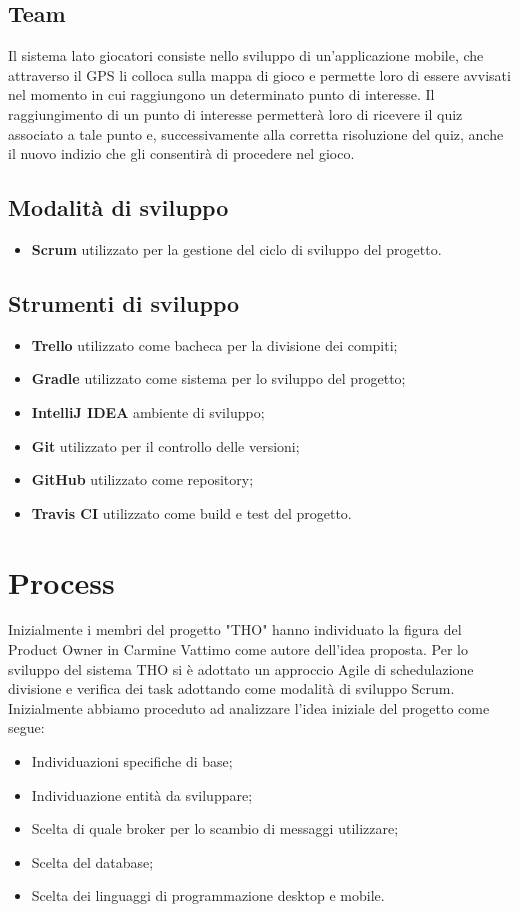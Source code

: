 \documentclass[10pt, english]{article}
\begin{document}
\subsection*{Team}
Il sistema lato giocatori consiste nello sviluppo di un'applicazione mobile, che attraverso il GPS li colloca sulla mappa di gioco e permette loro di essere avvisati nel momento in cui raggiungono un determinato punto di interesse. Il raggiungimento di un punto di interesse permetterà loro di ricevere il quiz associato a tale punto e, successivamente alla corretta risoluzione del quiz, anche il nuovo indizio che gli consentirà di procedere nel gioco.

\subsection*{Modalità di sviluppo}
\begin{itemize}
	\item \textbf{Scrum} utilizzato per la gestione del ciclo di sviluppo del progetto.
\end{itemize}
\subsection*{Strumenti di sviluppo}
\begin{itemize}
	\item \textbf{Trello} utilizzato come bacheca per la divisione dei compiti;
	\item \textbf{Gradle} utilizzato come sistema per lo sviluppo del progetto;
	\item \textbf{IntelliJ IDEA} ambiente di sviluppo;
	\item \textbf{Git} utilizzato per il controllo delle versioni;
	\item \textbf{GitHub} utilizzato come repository;
	\item \textbf{Travis CI} utilizzato come build e test del progetto.
\end{itemize}

\section{Process}
Inizialmente i membri del progetto "THO" hanno individuato la figura del Product Owner in Carmine Vattimo come autore dell'idea proposta. Per lo sviluppo del sistema THO si è adottato un approccio Agile di schedulazione divisione e verifica dei task adottando come modalità di sviluppo Scrum. 
\\ Inizialmente abbiamo proceduto ad analizzare l'idea iniziale del progetto come segue:
\begin{itemize}
	\item Individuazioni specifiche di base;
	\item Individuazione entità da sviluppare;
	\item Scelta di quale broker per lo scambio di messaggi utilizzare;
	\item Scelta del database;
	\item Scelta dei linguaggi di programmazione desktop e mobile.
\end{itemize}
\end{document}

